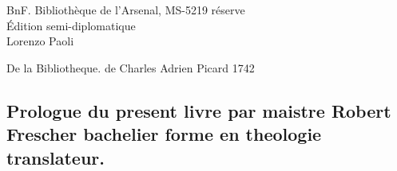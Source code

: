 \documentclass[12pt]{article}
\begin{document}
\begin{center}
  {\LARGE BnF. Bibliothèque de l'Arsenal, MS-5219 réserve}\\[2ex]
  {\Large Édition semi-diplomatique}\\[2ex]  {\large Lorenzo Paoli}
\end{center}

\newpage

\modulolinenumbers[5]   %
\linenumbers


    



\newpage
De la Bibliotheque. de Charles Adrien Picard
          1742





\subsection*{Prologue du present livre par maistre Robert\\
Frescher bachelier forme en theologie translateur.}
\end{document}
